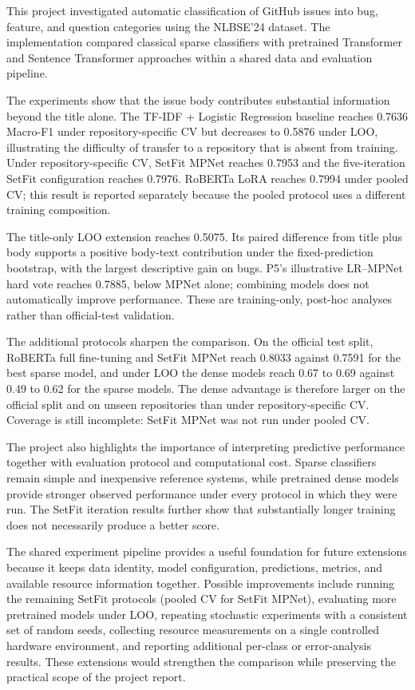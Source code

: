 This project investigated automatic classification of GitHub issues into bug, feature, and question categories using the NLBSE'24 dataset. The implementation compared classical sparse classifiers with pretrained Transformer and Sentence Transformer approaches within a shared data and evaluation pipeline.

The experiments show that the issue body contributes substantial information beyond the title alone. The TF-IDF + Logistic Regression baseline reaches 0.7636 Macro-F1 under repository-specific CV but decreases to 0.5876 under LOO, illustrating the difficulty of transfer to a repository that is absent from training. Under repository-specific CV, SetFit MPNet reaches 0.7953 and the five-iteration SetFit configuration reaches 0.7976. RoBERTa LoRA reaches 0.7994 under pooled CV; this result is reported separately because the pooled protocol uses a different training composition.

The title-only LOO extension reaches 0.5075. Its paired difference from title plus body supports a positive body-text contribution under the fixed-prediction bootstrap, with the largest descriptive gain on bugs. P5's illustrative LR--MPNet hard vote reaches 0.7885, below MPNet alone; combining models does not automatically improve performance. These are training-only, post-hoc analyses rather than official-test validation.

The additional protocols sharpen the comparison. On the official test split, RoBERTa full fine-tuning and SetFit MPNet reach 0.8033 against 0.7591 for the best sparse model, and under LOO the dense models reach 0.67 to 0.69 against 0.49 to 0.62 for the sparse models. The dense advantage is therefore larger on the official split and on unseen repositories than under repository-specific CV. Coverage is still incomplete: SetFit MPNet was not run under pooled CV.

The project also highlights the importance of interpreting predictive performance together with evaluation protocol and computational cost. Sparse classifiers remain simple and inexpensive reference systems, while pretrained dense models provide stronger observed performance under every protocol in which they were run. The SetFit iteration results further show that substantially longer training does not necessarily produce a better score.

The shared experiment pipeline provides a useful foundation for future extensions because it keeps data identity, model configuration, predictions, metrics, and available resource information together. Possible improvements include running the remaining SetFit protocols (pooled CV for SetFit MPNet), evaluating more pretrained models under LOO, repeating stochastic experiments with a consistent set of random seeds, collecting resource measurements on a single controlled hardware environment, and reporting additional per-class or error-analysis results. These extensions would strengthen the comparison while preserving the practical scope of the project report.
